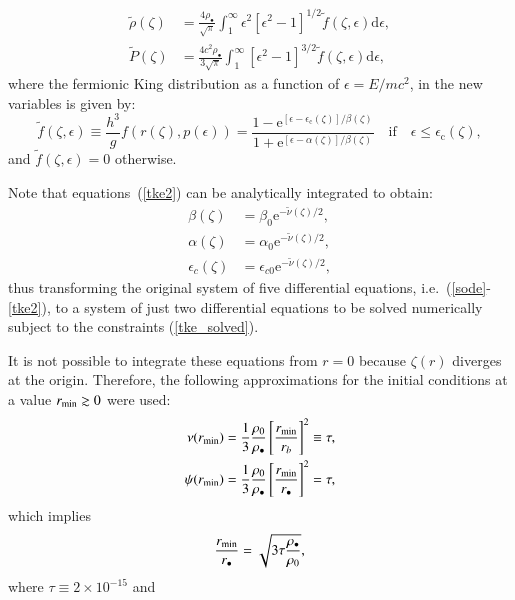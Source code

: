 \documentclass[twocolumn]{aa}
\begin{document}
\begin{appendix}
\begin{align}
    \tilde{\rho}(\zeta)&=\frac{4\rho_{\bullet}}{\sqrt{\pi}}\int^\infty_1\epsilon^2[\epsilon^2-1]^{1/2}\tilde{f}(\zeta,\epsilon)\mathrm{d}\epsilon,\\
   \tilde{P}(\zeta)&=\frac{4c^2\rho_{\bullet}}{3\sqrt{\pi}}\int^\infty_1[\epsilon^2-1]^{3/2}\tilde{f}(\zeta,\epsilon)\mathrm{d}\epsilon,
\end{align}
where the fermionic King distribution as a function of
$\epsilon=E/mc^2$, in the new variables is given by:
\begin{equation}
\tilde{f}(\zeta,\epsilon)\equiv \frac{h^3}{g}f(r(\zeta),p(\epsilon))=
      \frac{1-\mathrm {e}^{[\epsilon-\epsilon_\mathrm{c}(\zeta)]/\beta(\zeta)}}
      {1+\mathrm {e}^{[\epsilon-\alpha(\zeta)]/\beta(\zeta)}}\quad\mathrm{if}\quad \epsilon \leq \epsilon_\mathrm{c}(\zeta),
\end{equation}
and $\tilde{f}(\zeta,\epsilon) = 0$ otherwise.

Note that equations~(\ref{tke2}) can be analytically integrated to obtain:
\begin{align}
 \beta(\zeta) &= \beta_0\mathrm{e}^{-\tilde{\nu}(\zeta)/2}, \nonumber\\
 \alpha(\zeta) &= \alpha_0\mathrm{e}^{-\tilde{\nu}(\zeta)/2}, \nonumber\\
 \epsilon_c(\zeta) &= \epsilon_{c0}\mathrm{e}^{-\tilde{\nu}(\zeta)/2}, 
 \label{tke_solved}
\end{align}
thus transforming the original system of five differential equations, i.e.~(\ref{sode}-\ref{tke2}), to a system of just two differential equations to be solved numerically subject to the constraints (\ref{tke_solved}).

It is not possible to integrate these equations from $r=0$ because $\zeta(r)$ diverges at the origin. 
Therefore, the following approximations for the initial conditions at a value $r_{\rm{min}}\gtrsim 0$ were used:
\begin{align}
   \nu(r_{\rm{min}}) &= \frac{1}{3}\frac{\rho_0}{\rho_\bullet}\left[\frac{r_{\rm{min}}}{r_b}\right]^2\equiv \tau, \\
   \psi(r_{\rm{min}})&= \frac{1}{3}\frac{\rho_0}{\rho_\bullet}\left[\frac{r_{\rm{min}}}{r_\bullet}\right]^2 = \tau,
\end{align}
which implies
\begin{equation}
   \frac{r_{\rm{min}}}{r_\bullet}=\sqrt{3\tau\frac{\rho_\bullet}{\rho_0}},
\end{equation} 
where 
$\tau\equiv 2\times10^{-15}$ and


\end{appendix}
\end{document}
